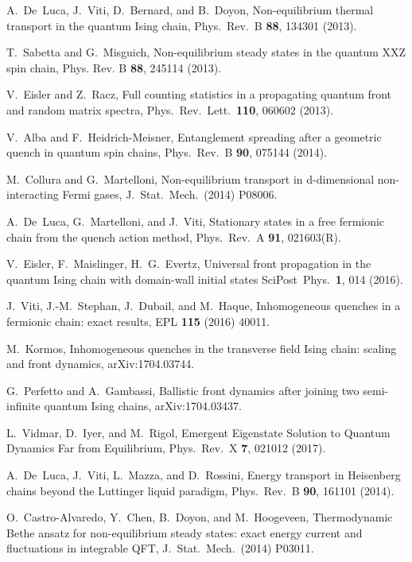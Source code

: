 \documentclass[twocolumn,superscriptaddress,prb,10pt]{revtex4-1}
\begin{document}
\begin{thebibliography}{99}
A.~De~Luca, J.~Viti, D.~Bernard, and B.~Doyon, 
Non-equilibrium thermal transport in the quantum Ising chain, 
Phys.\ Rev.\ B {\bf 88}, 134301 (2013). 

T.~Sabetta and G.~Misguich, 
Non-equilibrium steady states in the quantum XXZ spin chain, 
Phys. Rev. B {\bf 88}, 245114 (2013). 


V.~Eisler and Z.~Racz, 
Full counting statistics in a propagating quantum front and random matrix spectra, 
Phys.\ Rev.\ Lett.\ {\bf 110}, 060602 (2013). 


V.~Alba and  F.~Heidrich-Meisner, 
Entanglement spreading after a geometric quench in quantum spin chains, 
Phys.\ Rev.\ B {\bf 90}, 075144 (2014). 

M.~Collura and G.~Martelloni, 
Non-equilibrium transport in d-dimensional non-interacting Fermi gases, 
J.\ Stat.\ Mech.\ (2014) P08006.  

A.~De~Luca, G.~Martelloni, and J.~Viti, 
Stationary states in a free fermionic chain from the quench action method, 
Phys.\ Rev.\ A {\bf 91}, 021603(R). 

V.~Eisler, F.~Maislinger, H.~G.~Evertz, 
Universal front propagation in the quantum Ising chain with domain-wall initial states
SciPost\ Phys.\ {\bf 1}, 014 (2016).  

J.~Viti, J.-M.~Stephan, J.~Dubail, and M.~Haque, 
Inhomogeneous quenches in a fermionic chain: exact results, 
EPL {\bf 115} (2016) 40011. 

	M.~Kormos, 
	Inhomogeneous quenches in the transverse field Ising chain: scaling and front dynamics, 
	arXiv:1704.03744. 

G.~Perfetto and A.~Gambassi, 
Ballistic front dynamics after joining two semi-infinite quantum Ising chains, 
arXiv:1704.03437. 

	L.~Vidmar, D.~Iyer, and M.~Rigol, 
	Emergent Eigenstate Solution to Quantum Dynamics Far from Equilibrium, 
	Phys.\ Rev.\ X {\bf 7}, 021012 (2017). 

A.~De~Luca, J.~Viti, L.~Mazza, and D.~Rossini, 
Energy transport in Heisenberg chains beyond the Luttinger liquid paradigm, 
Phys.\ Rev.\ B {\bf 90}, 161101 (2014). 

O.~Castro-Alvaredo, Y.~Chen, B.~Doyon, and M.~Hoogeveen, 
Thermodynamic Bethe ansatz for non-equilibrium steady states: 
exact energy current and fluctuations in integrable QFT, 
J.\ Stat.\ Mech.\ (2014) P03011. 


\end{thebibliography}
\end{document}

